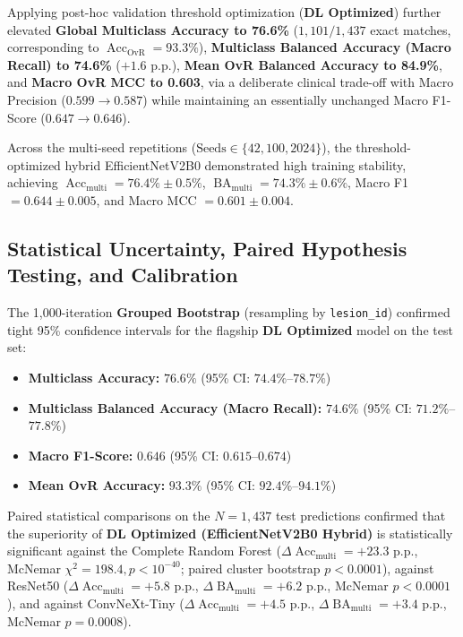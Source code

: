\documentclass[11pt,a4paper]{article}
\begin{document}
Applying post-hoc validation threshold optimization (\textbf{DL Optimized}) further elevated \textbf{Global Multiclass Accuracy to 76.6\%} ($1,101 / 1,437$ exact matches, corresponding to $\operatorname{Acc}_{\text{OvR}} = 93.3\%$), \textbf{Multiclass Balanced Accuracy (Macro Recall) to 74.6\%} ($+1.6$ p.p.), \textbf{Mean OvR Balanced Accuracy to 84.9\%}, and \textbf{Macro OvR MCC to 0.603}, via a deliberate clinical trade-off with Macro Precision ($0.599 \to 0.587$) while maintaining an essentially unchanged Macro F1-Score ($0.647 \to 0.646$).

Across the multi-seed repetitions ($\text{Seeds} \in \{42, 100, 2024\}$), the threshold-optimized hybrid EfficientNetV2B0 demonstrated high training stability, achieving $\operatorname{Acc}_{\text{multi}} = 76.4\% \pm 0.5\%$, $\operatorname{BA}_{\text{multi}} = 74.3\% \pm 0.6\%$, Macro F1 $= 0.644 \pm 0.005$, and Macro MCC $= 0.601 \pm 0.004$.

\subsection{Statistical Uncertainty, Paired Hypothesis Testing, and Calibration}
The 1,000-iteration \textbf{Grouped Bootstrap} (resampling by \texttt{lesion\_id}) confirmed tight 95\% confidence intervals for the flagship \textbf{DL Optimized} model on the test set:
\begin{itemize}
    \item \textbf{Multiclass Accuracy:} $76.6\%$ (95\% CI: $74.4\%$--$78.7\%$)
    \item \textbf{Multiclass Balanced Accuracy (Macro Recall):} $74.6\%$ (95\% CI: $71.2\%$--$77.8\%$)
    \item \textbf{Macro F1-Score:} $0.646$ (95\% CI: $0.615$--$0.674$)
    \item \textbf{Mean OvR Accuracy:} $93.3\%$ (95\% CI: $92.4\%$--$94.1\%$)
\end{itemize}

Paired statistical comparisons on the $N = 1,437$ test predictions confirmed that the superiority of \textbf{DL Optimized (EfficientNetV2B0 Hybrid)} is statistically significant against the Complete Random Forest ($\Delta \operatorname{Acc}_{\text{multi}} = +23.3$ p.p., McNemar $\chi^2 = 198.4, p < 10^{-40}$; paired cluster bootstrap $p < 0.0001$), against ResNet50 ($\Delta \operatorname{Acc}_{\text{multi}} = +5.8$ p.p., $\Delta \operatorname{BA}_{\text{multi}} = +6.2$ p.p., McNemar $p < 0.0001$), and against ConvNeXt-Tiny ($\Delta \operatorname{Acc}_{\text{multi}} = +4.5$ p.p., $\Delta \operatorname{BA}_{\text{multi}} = +3.4$ p.p., McNemar $p = 0.0008$).
\end{document}
